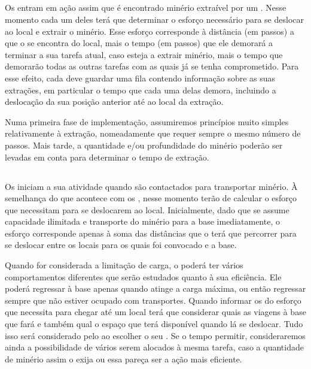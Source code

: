 \documentclass[12pt]{report}
\begin{document}
\subsection{\Producer}
Os \producers entram em ação assim que é encontrado minério extraível por um \spotter. Nesse momento cada um deles terá que determinar o esforço necessário para se deslocar ao local e extrair o minério. Esse esforço corresponde à distância (em passos) a que o \producer se encontra do local, mais o tempo (em passos) que ele demorará a terminar a sua tarefa atual, caso esteja a extrair minério, mais o tempo que demorarão todas as outras tarefas com as quais já se tenha comprometido. Para esse efeito, cada \producer deve guardar uma fila contendo informação sobre as suas extrações, em particular o tempo que cada uma delas demora, incluindo a deslocação da sua posição anterior até ao local da extração.

Numa primeira fase de implementação, assumiremos princípios muito simples relativamente à extração, nomeadamente que requer sempre o mesmo número de passos. Mais tarde, a quantidade e/ou profundidade do minério poderão ser levadas em conta para determinar o tempo de extração.

\subsection{\Transporter}
Os \transporters iniciam a sua atividade quando são contactados para transportar minério. À semelhança do que acontece com os \producers, nesse momento terão de calcular o esforço que necessitam para se deslocarem ao local. Inicialmente, dado que se assume capacidade ilimitada e transporte do minério para a base imediatamente, o esforço corresponde apenas à soma das distâncias que o \transporter terá que percorrer para se deslocar entre os locais para os quais foi convocado e a base. 

Quando for considerada a limitação de carga, o \transporter poderá ter vários comportamentos diferentes que serão estudados quanto à sua eficiência. Ele poderá regressar à base apenas quando atinge a carga máxima, ou então regressar sempre que não estiver ocupado com transportes. Quando informar os \producers do esforço que necessita para chegar até um local terá que considerar quais as viagens à base que fará e também qual o espaço que terá disponível quando lá se deslocar. Tudo isso será considerado pelo \producer ao escolher o seu \transporter. Se o tempo permitir, consideraremos ainda a possibilidade de vários \transporters serem alocados à mesma tarefa, caso a quantidade de minério assim o exija ou essa pareça ser a ação mais eficiente.
\end{document}
